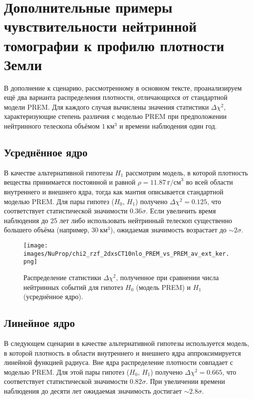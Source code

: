 \section{Дополнительные примеры чувствительности нейтринной томографии к профилю плотности Земли}
\label{sec:appTomography}

В дополнение к сценарию, рассмотренному в основном тексте, проанализируем ещё два варианта распределения плотности, отличающихся от стандартной модели PREM.  
Для каждого случая вычислены значения статистики $\Delta\chi^2$, характеризующие степень различия с моделью PREM при предположении нейтринного телескопа объёмом $1~\text{км}^3$ и времени наблюдения один год.

\subsection{Усреднённое ядро}

В качестве альтернативной гипотезы $H_1$ рассмотрим модель, в которой плотность вещества принимается постоянной и равной $\rho = 11.87~\text{г/см}^3$ во всей области внутреннего и внешнего ядра, тогда как мантия описывается стандартной моделью PREM.  
Для пары гипотез ($H_0$, $H_1$) получено $\Delta\chi^2 = 0.125$, что соответствует статистической значимости $0.36\sigma$.  
Если увеличить время наблюдения до 25 лет либо использовать нейтринный телескоп существенно большего объёма (например, $30~\text{км}^3$), ожидаемая значимость возрастает до $\sim 2\sigma$.

\begin{figure}[!h]
    \centering
    \texttt{[image: images/NuProp/chi2\_rzf\_2dxsCT10nlo\_PREM\_vs\_PREM\_av\_ext\_ker.png]}
    \caption{Распределение статистики $\Delta\chi^2$, полученное при сравнении числа нейтринных событий для гипотез $H_0$ (модель PREM) и $H_1$ (усреднённое ядро).}
    \label{NuTom2}
\end{figure}

\subsection{Линейное ядро}

В следующем сценарии в качестве альтернативной гипотезы используется модель, в которой плотность в области внутреннего и внешнего ядра аппроксимируется линейной функцией радиуса.  
Вне ядра распределение плотности совпадает с моделью PREM.  
Для этой пары гипотез ($H_0$, $H_1$) получено $\Delta\chi^2 = 0.665$, что соответствует статистической значимости $0.82\sigma$.  
При увеличении времени наблюдения до десяти лет ожидаемая значимость достигает $\sim 2.8\sigma$.

